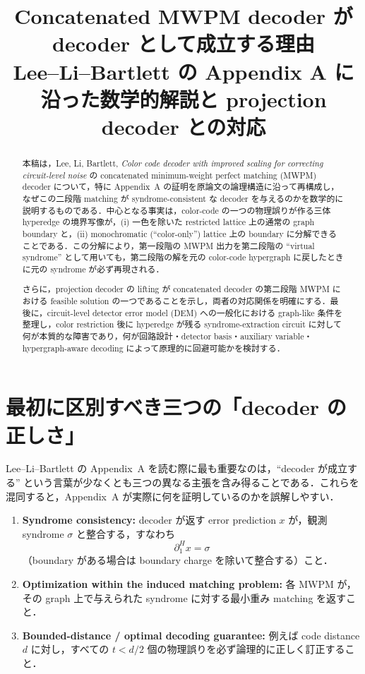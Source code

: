\documentclass[a4paper,11pt]{ltjsarticle}
\title{Concatenated MWPM decoder が decoder として成立する理由\\
\large Lee--Li--Bartlett の Appendix A に沿った数学的解説と projection decoder との対応}
\author{}
\date{}
\newcommand{\bd}{\partial}
\begin{document}
\maketitle

\begin{abstract}
本稿は，Lee, Li, Bartlett, \emph{Color code decoder with improved scaling for correcting circuit-level noise} の concatenated minimum-weight perfect matching (MWPM) decoder について，特に Appendix~A の証明を原論文の論理構造に沿って再構成し，なぜこの二段階 matching が syndrome-consistent な decoder を与えるのかを数学的に説明するものである．中心となる事実は，color-code の一つの物理誤りが作る三体 hyperedge の境界写像が，(i) 一色を除いた restricted lattice 上の通常の graph boundary と，(ii) monochromatic (``color-only'') lattice 上の boundary に分解できることである．この分解により，第一段階の MWPM 出力を第二段階の ``virtual syndrome'' として用いても，第二段階の解を元の color-code hypergraph に戻したときに元の syndrome が必ず再現される．

さらに，projection decoder の lifting が concatenated decoder の第二段階 MWPM における feasible solution の一つであることを示し，両者の対応関係を明確にする．最後に，circuit-level detector error model (DEM) への一般化における graph-like 条件を整理し，color restriction 後に hyperedge が残る syndrome-extraction circuit に対して何が本質的な障害であり，何が回路設計・detector basis・auxiliary variable・hypergraph-aware decoding によって原理的に回避可能かを検討する．
\end{abstract}

\tableofcontents

\section{最初に区別すべき三つの「decoder の正しさ」}

Lee--Li--Bartlett の Appendix~A を読む際に最も重要なのは，``decoder が成立する'' という言葉が少なくとも三つの異なる主張を含み得ることである．これらを混同すると，Appendix~A が実際に何を証明しているのかを誤解しやすい．

\begin{enumerate}[label=(\roman*)]
  \item \textbf{Syndrome consistency:} decoder が返す error prediction $x$ が，観測 syndrome $\sigma$ と整合する，すなわち
  \begin{equation}
    \bd_1^H x = \sigma
  \end{equation}
  （boundary がある場合は boundary charge を除いて整合する）こと．

  \item \textbf{Optimization within the induced matching problem:} 各 MWPM が，その graph 上で与えられた syndrome に対する最小重み matching を返すこと．

  \item \textbf{Bounded-distance / optimal decoding guarantee:} 例えば code distance $d$ に対し，すべての $t<d/2$ 個の物理誤りを必ず論理的に正しく訂正すること．
\end{enumerate}
\end{document}
